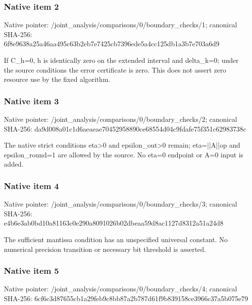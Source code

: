 \documentclass[10pt,a4paper]{article}
\begin{document}
\subsubsection{Native item 2}
Native pointer: /joint\_\allowbreak{}analysis/comparisons/0/boundary\_\allowbreak{}checks/1; canonical SHA-256: 6f8e9638a25a46aa495c63b2eb7e7425cb7396ede5a4cc125db1a3b7e703a6d9

\begingroup\raggedright\sloppy If C\_\allowbreak{}h=\allowbreak{}0,\allowbreak{} h is identically zero on the extended interval and delta\_\allowbreak{}k=\allowbreak{}0;\allowbreak{} under the source conditions the error certificate is zero. This does not assert zero resource use by the fixed algorithm.\par\endgroup

\subsubsection{Native item 3}
Native pointer: /joint\_\allowbreak{}analysis/comparisons/0/boundary\_\allowbreak{}checks/2; canonical SHA-256: da9d008a01c1d6aeaeae70452958890ce68554d04c9fdafe75f351c62983738c

\begingroup\raggedright\sloppy The native strict conditions eta>0 and epsilon\_\allowbreak{}out>0 remain;\allowbreak{} eta=\allowbreak{}||A||op and epsilon\_\allowbreak{}round=\allowbreak{}1 are allowed by the source. No eta=\allowbreak{}0 endpoint or A=\allowbreak{}0 input is added.\par\endgroup

\subsubsection{Native item 4}
Native pointer: /joint\_\allowbreak{}analysis/comparisons/0/boundary\_\allowbreak{}checks/3; canonical SHA-256: e4b6e3ab0bd10a81163c0e290a8091026b02dbeaa59d8ac1127d8312a51a24d8

\begingroup\raggedright\sloppy The sufficient mantissa condition has an unspecified universal constant. No numerical precision transition or necessary bit threshold is asserted.\par\endgroup

\subsubsection{Native item 5}
Native pointer: /joint\_\allowbreak{}analysis/comparisons/0/boundary\_\allowbreak{}checks/4; canonical SHA-256: 6cf6c3d87655cb1a29feb9c8bb87a2b787d61f9b839158ce3966c37a5b075e79
\end{document}
